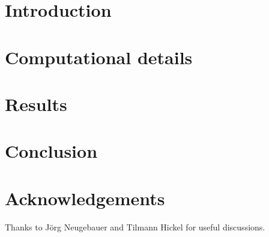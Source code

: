 

\title{\titletext}



    \maketitle

    \section{Introduction}
        \label{sec:introduction}
        

    \section{Computational details}
        \label{sec:computational}
        

    \section{Results}
        \label{sec:results}
        

    \section{Conclusion}
        \label{sec:conclusion}
        

    \section*{Acknowledgements}
        \label{sec:acknowledgement}
        Thanks to J\"org Neugebauer and Tilmann Hickel for useful discussions.

    
    

